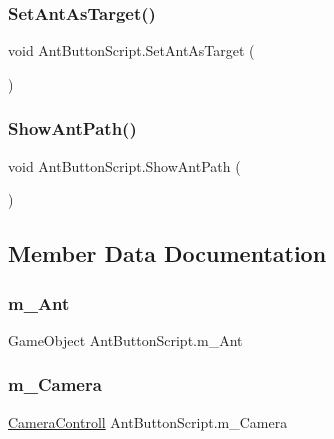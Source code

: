 \subsubsection{\texorpdfstring{SetAntAsTarget()}{SetAntAsTarget()}}
{\footnotesize\ttfamily void Ant\+Button\+Script.\+Set\+Ant\+As\+Target (\begin{DoxyParamCaption}{ }\end{DoxyParamCaption})}

\mbox{\label{class_ant_button_script_a029d9e33c7cb613ab43080966be99109}} 
\subsubsection{\texorpdfstring{ShowAntPath()}{ShowAntPath()}}
{\footnotesize\ttfamily void Ant\+Button\+Script.\+Show\+Ant\+Path (\begin{DoxyParamCaption}{ }\end{DoxyParamCaption})}



\subsection{Member Data Documentation}
\mbox{\label{class_ant_button_script_a57fa1a06d07ebcd541723078286bbadf}} 
\subsubsection{\texorpdfstring{m\_Ant}{m\_Ant}}
{\footnotesize\ttfamily Game\+Object Ant\+Button\+Script.\+m\+\_\+\+Ant}

\mbox{\label{class_ant_button_script_a6b175c048310e33ac569582d58a46429}} 
\subsubsection{\texorpdfstring{m\_Camera}{m\_Camera}}
{\footnotesize\ttfamily \mbox{\hyperlink{class_camera_controll}{Camera\+Controll}} Ant\+Button\+Script.\+m\+\_\+\+Camera}

